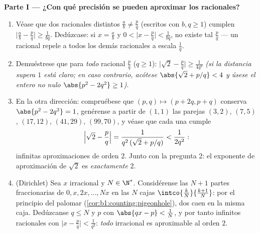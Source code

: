 \begin{problem}
\medskip
\noindent\textbf{Parte I --- ¿Con qué precisión se pueden aproximar
los racionales?}
\begin{enumerate}
  \item Véase que dos racionales distintos $\frac ab \neq \frac pq$
        (escritos con $b, q \geq 1$) cumplen
        $\bigl|\frac ab - \frac pq\bigr| \geq \frac{1}{bq}$.
        Dedúzcase: si $x = \frac ab$ y
        $0 < \bigl|x - \frac pq\bigr| < \frac{1}{bq}$, no existe tal
        $\frac pq$ --- un racional repele a todos los demás
        racionales a escala $\frac 1q$.
  \item Demuéstrese que para \emph{todo} racional $\frac pq$
        ($q \geq 1$): $\bigl|\sqrt2 - \frac pq\bigr| \geq
        \frac{1}{4q^2}$ \emph{(si la distancia supera $1$ está claro;
        en caso contrario, acótese $\abs{\sqrt2 + p/q} < 4$ y úsese
        el entero no nulo $\abs{p^2 - 2q^2} \geq 1$)}.
  \item En la otra dirección: compruébese que
        $(p, q) \mapsto (p + 2q, p + q)$ conserva
        $\abs{p^2 - 2q^2} = 1$, genérense a partir de $(1,1)$ las
        parejas $(3,2)$, $(7,5)$, $(17,12)$, $(41,29)$, $(99,70)$, y
        véase que cada una cumple
        \[
        \Bigl|\sqrt2 - \frac pq\Bigr| =
        \frac{1}{q^2\,(\sqrt2 + p/q)} < \frac{1}{2q^2} :
        \]
        infinitas aproximaciones de orden $2$. Junto con la
        pregunta 2: el exponente de aproximación de $\sqrt 2$ es
        \emph{exactamente} $2$.
  \item (Dirichlet) Sea $x$ irracional y $N \in \N^*$. Considérense
        las $N + 1$ partes fraccionarias de $0, x, 2x, \dots, Nx$ en
        las $N$ cajas $\intco{\frac kN}{\frac{k + 1}{N}}$: por el
        principio del palomar (\cref{cor:b1:counting:pigeonhole}), dos
        caen en la misma caja. Dedúzcanse $q \leq N$ y $p$ con
        $\abs{qx - p} < \frac 1N$, y por tanto infinitos racionales
        con $\bigl|x - \frac pq\bigr| < \frac{1}{q^2}$: \emph{todo}
        irracional es aproximable al orden $2$.
\end{enumerate}


\end{problem}
